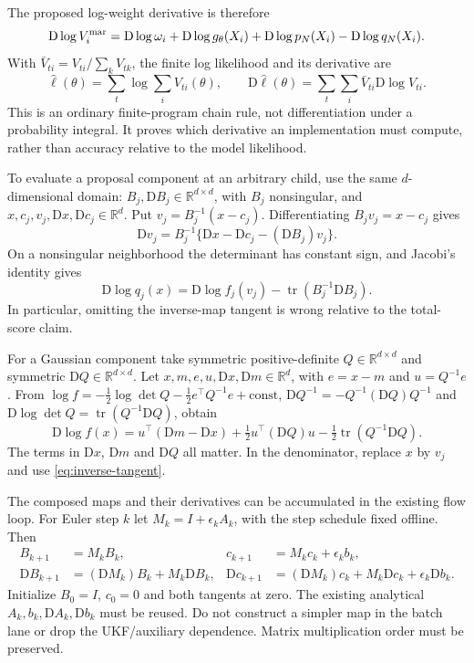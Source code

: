 \documentclass[11pt]{article}
\newcommand{\D}{\mathrm D}
\newcommand{\tr}{\operatorname{tr}}
\begin{document}
The proposed log-weight derivative is therefore
\begin{equation}
 \D\log V_i^{\rm mar}
 =\D\log\omega_i+\D\log g_\theta(X_i)
       +\D\log p_N(X_i)-\D\log q_N(X_i).
 \label{eq:weight-score}
\end{equation}
With $\bar V_{ti}=V_{ti}/\sum_k V_{tk}$, the finite log likelihood
and its derivative are
\begin{equation}
 \widehat\ell(\theta)=\sum_t\log\!\sum_i V_{ti}(\theta),\qquad
 \D\widehat\ell(\theta)=
             \sum_t\sum_i\bar V_{ti}\D\log V_{ti}.
 \label{eq:finite-score}
\end{equation}
This is an ordinary finite-program chain rule, not differentiation under
a probability integral. It proves which derivative an implementation must
compute, rather than accuracy relative to the model likelihood.

To evaluate a proposal component at an arbitrary child, use the same
$d$-dimensional domain: $B_j,\D B_j\in\mathbb R^{d\times d}$, with
$B_j$ nonsingular, and $x,c_j,v_j,\D x,\D c_j\in\mathbb R^d$. Put
$v_j=B_j^{-1}(x-c_j)$. Differentiating $B_jv_j=x-c_j$ gives
\begin{equation}
 \D v_j=B_j^{-1}\{\D x-\D c_j-(\D B_j)v_j\}.
 \label{eq:inverse-tangent}
\end{equation}
On a nonsingular neighborhood the determinant has constant sign, and
Jacobi's identity gives
\begin{equation}
 \D\log q_j(x)=\D\log f_j(v_j)
                      -\tr(B_j^{-1}\D B_j).
 \label{eq:proposal-score}
\end{equation}
In particular, omitting the inverse-map tangent is wrong relative to the
total-score claim.

For a Gaussian component take symmetric positive-definite
$Q\in\mathbb R^{d\times d}$ and symmetric $\D Q\in\mathbb R^{d\times d}$.
Let $x,m,e,u,\D x,\D m\in\mathbb R^d$, with $e=x-m$ and $u=Q^{-1}e$.
From $\log f=-\tfrac12\log\det Q-\tfrac12 e^\top Q^{-1}e+\mathrm{const}$,
$\D Q^{-1}=-Q^{-1}(\D Q)Q^{-1}$ and
$\D\log\det Q=\tr(Q^{-1}\D Q)$, obtain
\begin{equation}
 \D\log f(x)
 =u^\top(\D m-\D x)
  +\tfrac12u^\top(\D Q)u-\tfrac12\tr(Q^{-1}\D Q).
 \label{eq:gaussian-score}
\end{equation}
The terms in $\D x$, $\D m$ and $\D Q$ all matter. In the denominator,
replace $x$ by $v_j$ and use \eqref{eq:inverse-tangent}.

The composed maps and their derivatives can be accumulated in the existing
flow loop. For Euler step $k$ let $M_k=I+\epsilon_k A_k$, with the step
schedule fixed offline. Then
\begin{align}
 B_{k+1}&=M_k B_k,& c_{k+1}&=M_k c_k+\epsilon_k b_k,
 \label{eq:map-composition}\\
 \D B_{k+1}&=(\D M_k)B_k+M_k\D B_k,&
 \D c_{k+1}&=(\D M_k)c_k+M_k\D c_k+\epsilon_k\D b_k .
 \label{eq:map-tangent}
\end{align}
Initialize $B_0=I$, $c_0=0$ and both tangents at zero.
The existing analytical $A_k,b_k,\D A_k,\D b_k$ must be reused.
Do not construct a simpler map in the batch lane or drop the UKF/auxiliary
dependence. Matrix multiplication order must be preserved.
\end{document}
